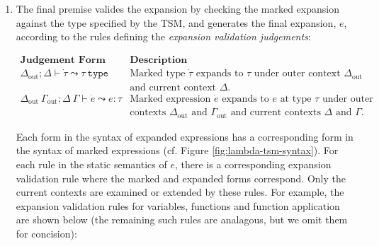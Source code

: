 {\begin{enumerate}
$\begin{array}{ll}
\textbf{Judgement Form} & \textbf{Description}\\
e : \mathsf{Var} \uparrow x & \text{$e$ decodes to variable $x$.}\\
e : \mathsf{TVar} \uparrow t & \text{$e$ decodes to type variable $t$.}\\
e : \mathsf{Type} \uparrow \dot{\tau} & \text{$e$ decodes to marked type $\dot{\tau}$.}\\
e : \mathsf{Exp} \uparrow \dot{e} & \text{$e$ decodes to marked expression $\dot{e}$.}\\
\end{array}$

The fifth premise decodes $e_\text{exp}$ to produce the \emph{marked expansion}, $\dot{e}_\text{exp}$. 
\item The final premise valides the expansion by checking the marked expansion against the type specified by the TSM, and generates the final expansion, $e$, according to the rules defining the \emph{expansion validation judgements}:

$\begin{array}{ll}
\textbf{Judgement Form} & \textbf{Description}\\
\Delta_\text{out}; \Delta \vdash \dot{\tau} \leadsto \tau~\mathtt{type} & \text{Marked type $\dot{\tau}$ expands to $\tau$ under outer context $\Delta_\text{out}$}\\
& \text{and current context $\Delta$.}\\
\Delta_\text{out}~\Gamma_\text{out}; \Delta~\Gamma \vdash \dot{e} \leadsto e : \tau & \text{Marked expression $\dot{e}$ expands to $e$ at type $\tau$ under outer}\\
& \text{contexts $\Delta_\text{out}$ and $\Gamma_\text{out}$ and current contexts $\Delta$ and $\Gamma$.}
\end{array}$

Each form in the syntax of expanded expressions has a corresponding form in the syntax of marked expressions (cf. Figure \ref{fig:lambda-tsm-syntax}). For each rule in the static semantics of $e$, there is a corresponding expansion validation rule where the marked and expanded forms correspond. Only the current contexts are examined or extended by these rules. For example, the expansion validation rules for variables, functions and function application are shown below (the remaining such rules are analagous, but we omit them for concision):
\begin{mathpar}


\end{mathpar}
\end{enumerate}}
